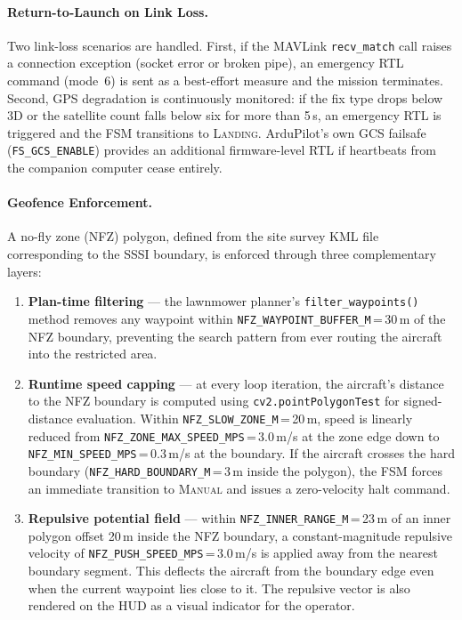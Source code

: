 \paragraph{Return-to-Launch on Link Loss.}
Two link-loss scenarios are handled. First, if the MAVLink \texttt{recv\_match} call raises a connection exception (socket error or broken pipe), an emergency RTL command (mode~6) is sent as a best-effort measure and the mission terminates. Second, GPS degradation is continuously monitored: if the fix type drops below 3D or the satellite count falls below six for more than 5\,s, an emergency RTL is triggered and the FSM transitions to \textsc{Landing}. ArduPilot's own GCS failsafe (\texttt{FS\_GCS\_ENABLE}) provides an additional firmware-level RTL if heartbeats from the companion computer cease entirely.

\paragraph{Geofence Enforcement.}
A no-fly zone (NFZ) polygon, defined from the site survey KML file corresponding to the SSSI boundary, is enforced through three complementary layers:

\begin{enumerate}
    \item \textbf{Plan-time filtering} --- the lawnmower planner's \texttt{filter\_waypoints()} method removes any waypoint within \texttt{NFZ\_WAYPOINT\_BUFFER\_M}\,=\,30\,m of the NFZ boundary, preventing the search pattern from ever routing the aircraft into the restricted area.
    \item \textbf{Runtime speed capping} --- at every loop iteration, the aircraft's distance to the NFZ boundary is computed using \texttt{cv2.pointPolygonTest} for signed-distance evaluation. Within \texttt{NFZ\_SLOW\_ZONE\_M}\,=\,20\,m, speed is linearly reduced from \texttt{NFZ\_ZONE\_MAX\_SPEED\_MPS}\,=\,3.0\,m/s at the zone edge down to \texttt{NFZ\_MIN\_SPEED\_MPS}\,=\,0.3\,m/s at the boundary. If the aircraft crosses the hard boundary (\texttt{NFZ\_HARD\_BOUNDARY\_M}\,=\,3\,m inside the polygon), the FSM forces an immediate transition to \textsc{Manual} and issues a zero-velocity halt command.
    \item \textbf{Repulsive potential field} --- within \texttt{NFZ\_INNER\_RANGE\_M}\,=\,23\,m of an inner polygon offset 20\,m inside the NFZ boundary, a constant-magnitude repulsive velocity of \texttt{NFZ\_PUSH\_SPEED\_MPS}\,=\,3.0\,m/s is applied away from the nearest boundary segment. This deflects the aircraft from the boundary edge even when the current waypoint lies close to it. The repulsive vector is also rendered on the HUD as a visual indicator for the operator.
\end{enumerate}

